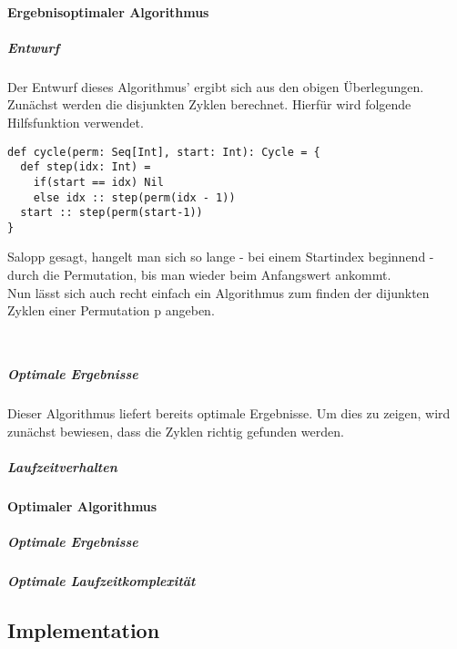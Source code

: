 \paragraph{Ergebnisoptimaler Algorithmus}
\subparagraph{Entwurf}
Der Entwurf dieses Algorithmus' ergibt sich aus den obigen Überlegungen. Zunächst werden die disjunkten Zyklen berechnet.
Hierfür wird folgende Hilfsfunktion verwendet.
\lstset{language=Scala}
\lstset{basicstyle=\small}
\begin{lstlisting}
def cycle(perm: Seq[Int], start: Int): Cycle = {
  def step(idx: Int) =
    if(start == idx) Nil
    else idx :: step(perm(idx - 1))
  start :: step(perm(start-1))
}
\end{lstlisting}
Salopp gesagt, hangelt man sich so lange - bei einem Startindex beginnend - durch die Permutation, bis man wieder beim Anfangswert ankommt.\\
Nun lässt sich auch recht einfach ein Algorithmus zum finden der dijunkten Zyklen einer Permutation p angeben.
\lstset{language=Scala}
\lstset{basicstyle=\small}
\begin{lstlisting}
 
\end{lstlisting}


\subparagraph{Optimale Ergebnisse}
Dieser Algorithmus liefert bereits optimale Ergebnisse. Um dies zu zeigen, wird zunächst bewiesen, dass die Zyklen richtig gefunden werden.

\subparagraph{Laufzeitverhalten} %
\paragraph{Optimaler Algorithmus}
\subparagraph{Optimale Ergebnisse}

\subparagraph{Optimale Laufzeitkomplexität}

\subsection{Implementation}
